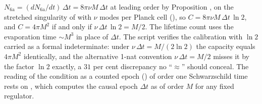 $N_{\mathrm{6a}} = (dN_{\mathrm{6a}}/dt)\,\Delta t = 8\pi\nu M\,\Delta t$ at leading order by Proposition , on the stretched singularity of  with $\nu$ modes per Planck cell (), so $C = 8\pi\nu M\,\Delta t\,\ln 2$, and $C = 4\pi M^{2}$ if and only if $\nu\,\Delta t\,\ln 2 = M/2$. The lifetime count uses the evaporation time $\sim M^{3}$ in place of $\Delta t$. The script verifies the calibration with $\ln 2$ carried as a formal indeterminate: under $\nu\,\Delta t = M/(2\ln 2)$ the capacity equals $4\pi M^{2}$ identically, and the alternative 1-nat convention $\nu\,\Delta t = M/2$ misses it by the factor $\ln 2$ exactly, a $31$ per cent discrepancy no ``$\approx$'' should conceal. The reading of the condition as a counted epoch () of order one Schwarzschild time rests on , which computes the causal epoch $\Delta t$ as of order $M$ for any fixed regulator.
